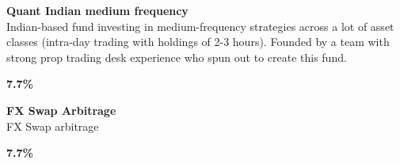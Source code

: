 \documentclass[11pt]{article}
\begin{document}
\begin{tcolorbox}[colback=cardbg, colframe=cardborder, boxrule=0.5pt, arc=4pt, left=6pt, right=6pt, top=6pt, bottom=6pt]
    \begin{minipage}[c]{0.82\linewidth}
        \textbf{\textcolor{primary}{Quant Indian medium frequency}} \\[4pt]
        \textcolor{primary}{Indian-based fund investing in medium-frequency strategies across a lot of asset classes (intra-day trading with holdings of 2-3 hours). Founded by a team with strong prop trading desk experience who spun out to create this fund.}
    \end{minipage}%
    \hfill
    \begin{minipage}[c]{0.15\linewidth}
        \centering
        \textbf{\Large \textcolor{accent}{7.7\%}}
    \end{minipage}
\end{tcolorbox}

\begin{tcolorbox}[colback=cardbg, colframe=cardborder, boxrule=0.5pt, arc=4pt, left=6pt, right=6pt, top=6pt, bottom=6pt]
    \begin{minipage}[c]{0.82\linewidth}
        \textbf{\textcolor{primary}{FX Swap Arbitrage}} \\[4pt]
        \textcolor{primary}{FX Swap arbitrage}
    \end{minipage}%
    \hfill
    \begin{minipage}[c]{0.15\linewidth}
        \centering
        \textbf{\Large \textcolor{accent}{7.7\%}}
    \end{minipage}
\end{tcolorbox}

\clearpage
\end{document}
